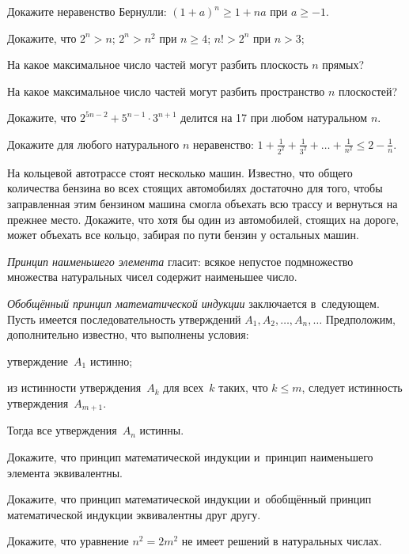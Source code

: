 \documentclass[a4paper,12pt]{article}
\begin{document}
Докажите неравенство Бернулли: $(1+a)^n\geq1+na$ при $a\geq-1$.

Докажите, что
 $2^n>n$;
 $2^n>n^2$ при $n\geqslant4$;
 $n!>2^n$ при $n>3$;

На какое максимальное число частей могут разбить плоскость $n$ прямых?

На какое максимальное число частей могут разбить пространство $n$ плоскостей?

Докажите, что $2^{5n-2}+5^{n-1}\cdot3^{n+1}$ делится на 17 при любом натуральном $n$.

Докажите для любого натурального $n$ неравенство: $\displaystyle{1+\frac1{2^2}+\frac1{3^2}+\dots+\frac1{n^2}\leq 2-\frac1{n}}$.

На кольцевой автотрассе стоят несколько машин. Известно, что общего количества бензина во всех стоящих автомобилях достаточно для того, чтобы заправленная этим бензином машина смогла объехать всю трассу и вернуться на прежнее место. Докажите, что хотя бы один из автомобилей, стоящих на дороге, может объехать все кольцо, забирая по пути бензин у остальных машин.

\vfill
{}
\newpage


\emph{Принцип наименьшего элемента} гласит:  всякое непустое подмножество множества натуральных чисел содержит наименьшее число.

\emph{Обобщённый принцип математической индукции} заключается в~следующем. Пусть имеется последовательность утверждений $A_1,A_2,\ldots,A_n,\ldots$ Предположим, дополнительно известно, что выполнены условия:
\begin{nums}{-1}
\item утверждение~$A_1$ истинно;
\item из истинности утверждения~$A_k$ для всех~$k$ таких, что $k \le m$, следует истинность утверждения~$A_{m+1}$.
\end{nums}
\vspace{-2mm}
Тогда все утверждения~$A_n$ истинны.

Докажите, что принцип математической индукции и~принцип наименьшего элемента эквивалентны.

Докажите, что принцип математической индукции и~обобщённый принцип математической индукции эквивалентны друг другу.

Докажите, что уравнение $n^2=2m^2$ не имеет решений в натуральных числах.
\end{document}
